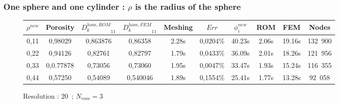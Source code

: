 {\subsubsection{One sphere and one cylinder : $\rho$ is the radius of the sphere}

\begin{comment}
\begin{figure}[H]%
%
\begin{center}
\begin{tabular}{|c|c||c|c||c|c||c|c||c||c|}
\hline
\rowcolor{lightgray} $\rho^{new}$&Porosity&${D_k^{hom,ROM}}_{11}$&${D_k^{hom,FEM}}_{11}$&Meshing&$Err$&$\phi_i^{new}$&ROM&FEM&Nodes\\
\hline
0,11&0,&0,&0,&s&0,\%&s&s&s&\\
\hline
0,22&0,&0,&0,&s&0,\%&s&s&s&\\
\hline
0,33&0,&0,&0,&s&0,\%&s&s&s&\\
\hline
0,44&0,&0,&0,&s&0,\%&s&s&s&\\
\hline
\end{tabular}
\end{center}
\caption{Resolution : $10$\ ; $N_{rom}=4$}
%
\end{figure}
\end{comment}

\begin{figure}[H]%
%
\begin{center}
\begin{tabular}{|c|c||c|c||c|c||c|c||c||c|}
\hline
\rowcolor{lightgray} $\rho^{new}$&Porosity&${D_k^{hom,ROM}}_{11}$&${D_k^{hom,FEM}}_{11}$&Meshing&$Err$&$\phi_i^{new}$&ROM&FEM&Nodes\\
\hline
0,11&0,98029&0,863876&0,86358&2.28s&0,0204\%&40.23s&2.06s&19.16s&132\ 900\\
\hline
0,22&0,94126&0,82761&0,82797&1.79s&0,0433\%&36.09s&2.01s&18.26s&121\ 956\\
\hline
0,33&0,0.77878&0,73056&0,73060&1.95s&0,0047\%&33.47s&1.93s&15.24s&116\ 355\\
\hline
0,44&0,57250&0,54089&0,540046&1.89s&0,1554\%&25.41s&1.77s&13.28s&92\ 058\\
\hline
\end{tabular}
\end{center}
\caption{Resolution : $20$\ ; $N_{rom}=3$}
%
\end{figure}

}
